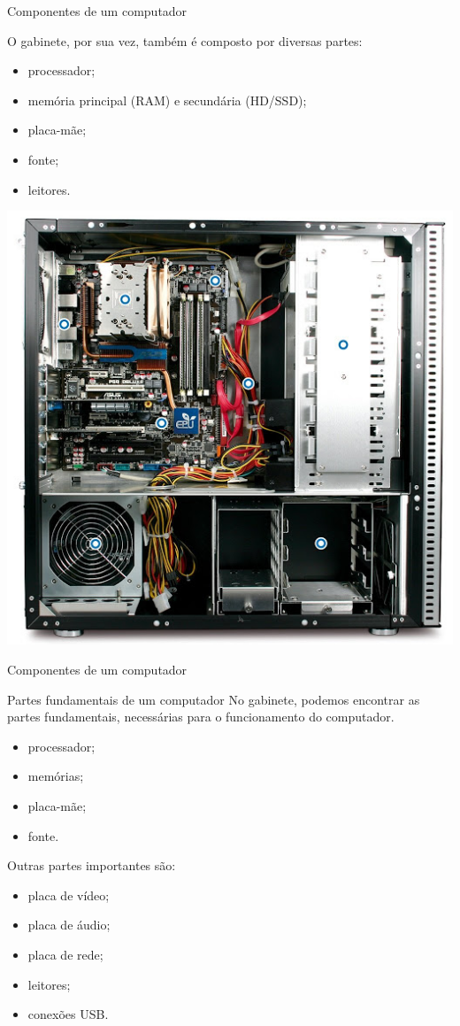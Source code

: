 \begin{frame}{Componentes de um computador}
	\begin{block}{}
		O gabinete, por sua vez, também é composto por diversas
		partes:
		\begin{itemize}
			\item processador;
			\item memória principal (RAM) e secundária (HD/SSD);
			\item placa-mãe;
			\item fonte;
			\item leitores.
		\end{itemize}
	\end{block}

	\centering
	\includegraphics[width=0.35\linewidth]{Figuras/Ch01/fig24}
\end{frame}


\begin{frame}{Componentes de um computador}
	\begin{block}{Partes fundamentais de um computador}
		No gabinete, podemos encontrar as partes fundamentais,
		necessárias para o funcionamento do computador.
		\begin{itemize}
			\item processador;
			\item memórias;
			\item placa-mãe;
			\item fonte.
		\end{itemize}

		Outras partes importantes são:

		\begin{itemize}
			\item placa de vídeo;
			\item placa de áudio;
			\item placa de rede;
			\item leitores;
			\item conexões USB.
		\end{itemize}
	\end{block}

\end{frame}



